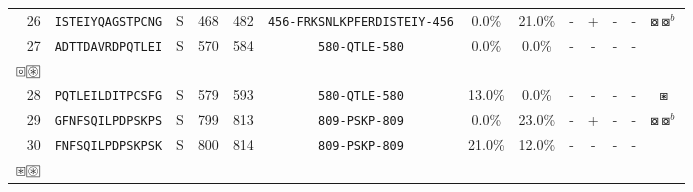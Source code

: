 \begin{tabular}{rcccccccccccc}
26 &  \texttt{ISTEIYQAGSTPCNG} &       S &    468 &   482 &  \texttt{{\scriptsize 456-}FRKSNLKPFERDISTEIY{\scriptsize -456}} &                           0.0\% &                           21.0\% &          - &           + &          - &           - &                                                                                                           $ \boxcircle \boxcircle^b $ \\
27 &  \texttt{ADTTDAVRDPQTLEI} &       S &    570 &   584 &                \texttt{{\scriptsize 580-}QTLE{\scriptsize -580}} &                           0.0\% &                            0.0\% &          - &           - &          - &           - &  \Centerstack{  $\boxempty \boxempty^d \boxempty^b \boxempty^{bd}$ \\  $\boxcircle \setlength{\fboxsep}{0.5pt} \boxed{\circledast}$ } \\
28 &  \texttt{PQTLEILDITPCSFG} &       S &    579 &   593 &                \texttt{{\scriptsize 580-}QTLE{\scriptsize -580}} &                          13.0\% &                            0.0\% &          - &           - &          - &           - &                                                                                                                           $ \boxast $ \\
29 &  \texttt{GFNFSQILPDPSKPS} &       S &    799 &   813 &                \texttt{{\scriptsize 809-}PSKP{\scriptsize -809}} &                           0.0\% &                           23.0\% &          - &           + &          - &           - &                                                                                                           $ \boxcircle \boxcircle^b $ \\
30 &  \texttt{FNFSQILPDPSKPSK} &       S &    800 &   814 &                \texttt{{\scriptsize 809-}PSKP{\scriptsize -809}} &                          21.0\% &                           12.0\% &          - &           - &          - &           - &     \Centerstack{  $\boxempty \boxempty^d \boxempty^b \boxempty^{bd}$ \\  $\boxast \setlength{\fboxsep}{0.5pt} \boxed{\circledast}$ } \\
\bottomrule
\end{tabular}
